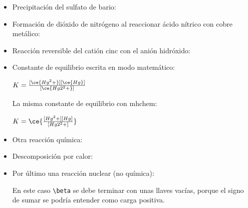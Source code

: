 \begin{itemize}
\item Precipitación del sulfato de bario:
\begin{Example}
\end{Example}

\item Formación de dióxido de nitrógeno al reaccionar ácido nítrico con cobre
metálico:
\begin{Example}[xrightmargin=5cm]
\end{Example}

\item Reacción reversible del catión cinc con el anión hidróxido:
\begin{Example}[xrightmargin=15cm]
\end{Example}

\item Constante de equilibrio escrita en modo matemático:
\begin{Example}[xrightmargin=5cm]
  $K = \frac{[\ce{Hg^2+}][\ce{Hg}]}{[\ce{Hg2^2+}]}$
\end{Example}

\vspace{2ex}
La misma constante de equilibrio con {\sffamily mhchem}:

\vspace{1ex}
\begin{Example}[xrightmargin=5cm]
  $K = \ce{\frac{[Hg^2+][Hg]}{[Hg2^2+]}}$
\end{Example}

\item Otra reacción química:
\begin{Example}[xrightmargin=5cm]
\end{Example}

\item Descomposición por calor:
  \begin{Example}
  \end{Example}

\item Por último una reacción nuclear (no química):
  \begin{Example}
  \end{Example}

  \vspace{1ex}
  En este caso \texttt{\textbackslash beta} se debe terminar con unas llaves vacías,
  porque el signo de sumar se podría entender como carga positiva.
\end{itemize}

